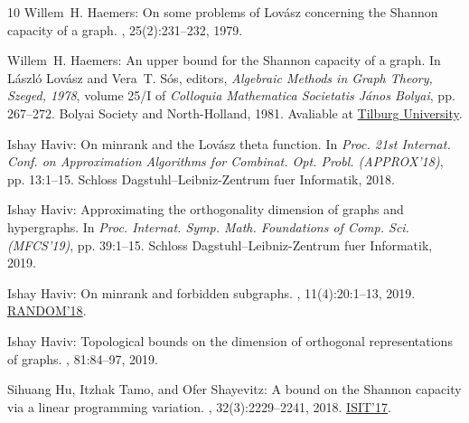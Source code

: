 \begin{thebibliography}{10}
{\sc Willem~H. Haemers}: On some problems of {L}ov\'asz concerning the
  {S}hannon capacity of a graph.
, 25(2):231--232, 1979.

{\sc Willem~H. Haemers}: An upper bound for the {S}hannon capacity of a graph.
\newblock In {\sc L\'aszl\'o Lov\'asz and Vera~T. S\'os}, editors, {\em
  Algebraic Methods in Graph Theory, Szeged, 1978}, volume 25/I of {\em
  Colloquia Mathematica Societatis J\'anos Bolyai}, pp. 267--272. Bolyai
  Society and North-Holland, 1981.
\newblock Avaliable at
  \href{https://pure.uvt.nl/ws/portalfiles/portal/997000/UPPER\_\_\_.PDF}{Tilburg
  University}.

{\sc Ishay Haviv}: On minrank and the {L}ov{\'{a}}sz theta function.
\newblock In {\em Proc. 21st Internat. Conf. on Approximation Algorithms for
  Combinat. Opt. Probl. (APPROX'18)}, pp. 13:1--15. Schloss
  Dagstuhl--Leibniz-Zentrum fuer Informatik, 2018.

{\sc Ishay Haviv}: Approximating the orthogonality dimension of graphs and
  hypergraphs.
\newblock In {\em Proc. Internat. Symp. Math. Foundations of Comp. Sci.
  (MFCS'19)}, pp. 39:1--15. Schloss Dagstuhl--Leibniz-Zentrum fuer Informatik,
  2019.

{\sc Ishay Haviv}: On minrank and forbidden subgraphs.
, 11(4):20:1--13, 2019.
\newblock \prelim
  \href{https:doi.org/10.4230/LIPIcs.APPROX-RANDOM.2018.42}{RANDOM'18}.
\newblock [\epfmtdoi{10.1145/3322817}]

{\sc Ishay Haviv}: Topological bounds on the dimension of orthogonal
  representations of graphs.
, 81:84--97, 2019.

{\sc Sihuang Hu, Itzhak Tamo, and Ofer Shayevitz}: A bound on the {S}hannon
  capacity via a linear programming variation.
, 32(3):2229--2241, 2018.
\newblock \prelim \href{https:doi.org/10.1109/ISIT.2017.8006691}{ISIT'17}.
\newblock [\epfmtdoi{10.1137/17M115565X}]


\end{thebibliography}
